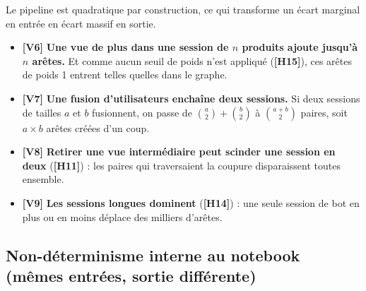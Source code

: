 \documentclass[11pt,a4paper]{article}
\newcommand{\hyp}[1]{\textcolor{hypcol}{\textbf{\small [#1]}}}
\begin{document}
Le pipeline est quadratique par construction, ce qui transforme un écart marginal
en entrée en écart massif en sortie.

\begin{itemize}[leftmargin=*]
  \item \hyp{V6} \textbf{Une vue de plus dans une session de $n$ produits ajoute
        jusqu'à $n$ arêtes.} Et comme aucun seuil de poids n'est appliqué
        (\hyp{H15}), ces arêtes de poids 1 entrent telles quelles dans le graphe.
  \item \hyp{V7} \textbf{Une fusion d'utilisateurs enchaîne deux sessions.} Si deux
        sessions de tailles $a$ et $b$ fusionnent, on passe de
        $\binom{a}{2} + \binom{b}{2}$ à $\binom{a+b}{2}$ paires, soit
        $a \times b$ arêtes créées d'un coup.
  \item \hyp{V8} \textbf{Retirer une vue intermédiaire peut scinder une session en
        deux} (\hyp{H11}) : les paires qui traversaient la coupure disparaissent
        toutes ensemble.
  \item \hyp{V9} \textbf{Les sessions longues dominent} (\hyp{H14}) : une seule
        session de bot en plus ou en moins déplace des milliers d'arêtes.
\end{itemize}

\subsection{Non-déterminisme interne au notebook (mêmes entrées, sortie différente)}
\end{document}
